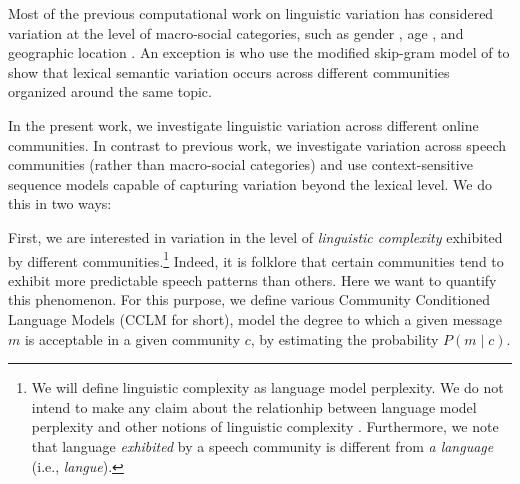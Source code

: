 \documentclass[11pt]{article}
\newcommand\jp[1]{\todo[backgroundcolor=blue!10]{JP: #1}}
\begin{document}
Most of the previous computational work on linguistic variation 
has considered variation at the level of macro-social categories, such as gender
\citep{Burger2011,Ciot2013,Bamman2014}, age \citep{Nguyen2013}, and
geographic location \citep{Eisenstein2010,Bamman2014a}.
An exception is \citet{DelTredici2017} who use the modified
skip-gram model of \citet{Bamman2014a} to show that lexical semantic
variation occurs across different communities organized around the
same topic.

In the present work, we investigate linguistic variation
across different online communities. In contrast to previous work, we
investigate variation across speech communities (rather than
macro-social categories) and use context-sensitive sequence models
capable of capturing variation beyond the lexical level.
We do this in two ways:

First, we are interested in
variation in the level of \emph{linguistic complexity}
exhibited by different communities.\footnote{
  We will define linguistic complexity as language model perplexity.
  We do not intend to make any claim about the relationhip
  between language model perplexity and other notions of linguistic
  complexity \citep[cf.][]{Hawkins2014}. Furthermore, we note that 
  language \emph{exhibited} by a speech community \citep[i.e., \emph{parole},][]{deSaussure2011}
  is  different from \emph{a language} (i.e., \emph{langue}).}
%  
%
%
Indeed, it is folklore that certain communities tend to exhibit more predictable
speech patterns than others.  Here we want to quantify this
phenomenon.  For this purpose, we define various Community Conditioned Language Models 
(CCLM for short), model the degree to which a
given message $m$ is acceptable in a given community $c$, by estimating the probability
\(P(m \mid c)\).
\end{document}
